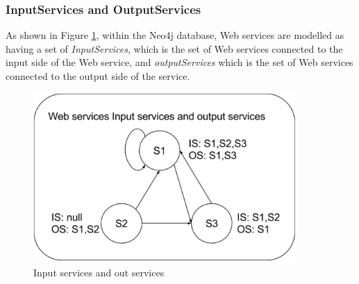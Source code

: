 \subsubsection {InputServices and OutputServices}
As shown in Figure \ref{fig:inputOutputServs}, within the Neo4j database, Web services are modelled as having a set of \emph{InputServices}, which is the set of Web services connected to the input side of the Web service, and  \emph{outputServices} which is the set of Web services connected to the output side of the service.\par
\begin{figure}[h]
\includegraphics[width=10cm]{InputServicesAndOutServices.pdf}
\centering
\caption{Input services and out services}
\label{fig:inputOutputServs} 
\end{figure} 

